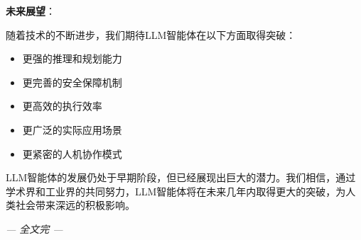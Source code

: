 \textbf{未来展望}：

随着技术的不断进步，我们期待LLM智能体在以下方面取得突破：
\begin{itemize}[leftmargin=2em]
    \item 更强的推理和规划能力
    \item 更完善的安全保障机制
    \item 更高效的执行效率
    \item 更广泛的实际应用场景
    \item 更紧密的人机协作模式
\end{itemize}

LLM智能体的发展仍处于早期阶段，但已经展现出巨大的潜力。我们相信，通过学术界和工业界的共同努力，LLM智能体将在未来几年内取得更大的突破，为人类社会带来深远的积极影响。

\vspace{2em}
\begin{center}
    \textit{--- 全文完 ---}
\end{center}
